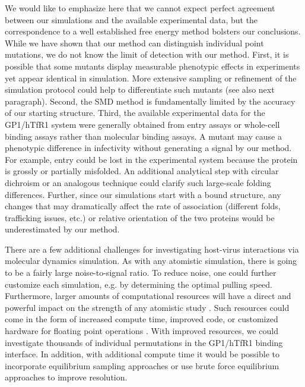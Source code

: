 \documentclass[12pt]{article}
\begin{document}
We would like to emphasize here that we cannot expect perfect agreement between our simulations and the available experimental data, but the correspondence to a well established free energy method bolsters our conclusions. While we have shown that our method can distinguish individual point mutations, we do not know the limit of detection with our method. First, it is possible that some mutants display measurable phenotypic effects in experiments yet appear identical in simulation. More extensive sampling or refinement of the simulation protocol could help to differentiate such mutants (see also next paragraph). Second, the SMD method is fundamentally limited by the accuracy of our starting structure. Third, the available experimental data for the GP1/hTfR1 system were generally obtained from entry assays or whole-cell binding assays rather than molecular binding assays. A mutant may cause a phenotypic difference in infectivity without generating a signal by our method. For example, entry could be lost in the experimental system because the protein is grossly or partially misfolded. An additional analytical step with circular dichroism or an analogous technique could clarify such large-scale folding differences. Further, since our simulations start with a bound structure, any changes that may dramatically affect the rate of association (different folds, trafficking issues, etc.) or relative orientation of the two proteins would be underestimated by our method. 

There are a few additional challenges for investigating host-virus interactions via molecular dynamics simulation. As with any atomistic simulation, there is going to be a fairly large noise-to-signal ratio. To reduce noise, one could further customize each simulation, e.g. by determining the optimal pulling speed. Furthermore, larger amounts of computational resources will have a direct and powerful impact on the strength of any atomistic study \citep{Shaw2012}. Such resources could come in the form of increased compute time, improved code, or customized hardware for floating point operations \citep{Shaw2011}. With improved resources, we could investigate thousands of individual permutations in the GP1/hTfR1 binding interface. In addition, with additional compute time it would be possible to incorporate equilibrium sampling approaches \citep{Buch2011} or use brute force equilibrium approaches \citep{Giorgino2012} to improve resolution. 
\end{document}
